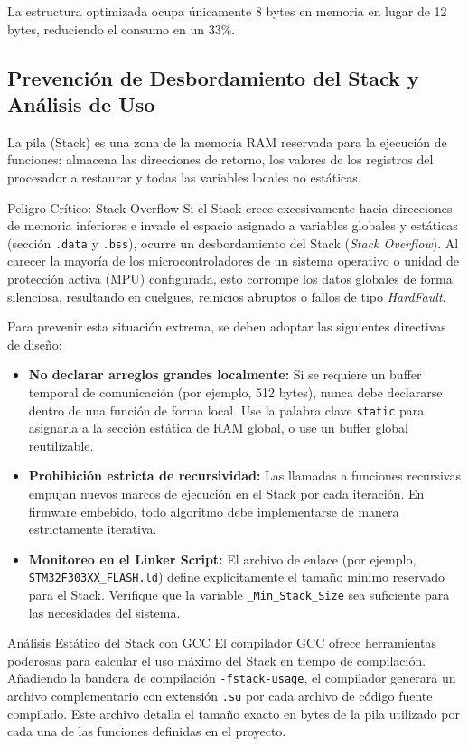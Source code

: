 \documentclass[
10pt, %
a4paper, %
oneside, %
headinclude,footinclude, %
BCOR5mm, %
]{scrartcl}
\begin{document}
La estructura optimizada ocupa únicamente 8 bytes en memoria en lugar de 12 bytes, reduciendo el consumo en un 33\%.

\subsection{Prevención de Desbordamiento del Stack y Análisis de Uso}
La pila (Stack) es una zona de la memoria RAM reservada para la ejecución de funciones: almacena las direcciones de retorno, los valores de los registros del procesador a restaurar y todas las variables locales no estáticas.

\begin{ErrorBox}{Peligro Crítico: Stack Overflow}
	Si el Stack crece excesivamente hacia direcciones de memoria inferiores e invade el espacio asignado a variables globales y estáticas (sección \texttt{.data} y \texttt{.bss}), ocurre un desbordamiento del Stack (\textit{Stack Overflow}). Al carecer la mayoría de los microcontroladores de un sistema operativo o unidad de protección activa (MPU) configurada, esto corrompe los datos globales de forma silenciosa, resultando en cuelgues, reinicios abruptos o fallos de tipo \textit{HardFault}.
\end{ErrorBox}

Para prevenir esta situación extrema, se deben adoptar las siguientes directivas de diseño:
\begin{itemize}
	\item \textbf{No declarar arreglos grandes localmente:} Si se requiere un buffer temporal de comunicación (por ejemplo, 512 bytes), nunca debe declararse dentro de una función de forma local. Use la palabra clave \texttt{static} para asignarla a la sección estática de RAM global, o use un buffer global reutilizable.
	\item \textbf{Prohibición estricta de recursividad:} Las llamadas a funciones recursivas empujan nuevos marcos de ejecución en el Stack por cada iteración. En firmware embebido, todo algoritmo debe implementarse de manera estrictamente iterativa.
	\item \textbf{Monitoreo en el Linker Script:} El archivo de enlace (por ejemplo, \texttt{STM32F303XX\_FLASH.ld}) define explícitamente el tamaño mínimo reservado para el Stack. Verifique que la variable \texttt{\_Min\_Stack\_Size} sea suficiente para las necesidades del sistema.
\end{itemize}

\begin{InfoBox}{Análisis Estático del Stack con GCC}
	El compilador GCC ofrece herramientas poderosas para calcular el uso máximo del Stack en tiempo de compilación. Añadiendo la bandera de compilación \texttt{-fstack-usage}, el compilador generará un archivo complementario con extensión \texttt{.su} por cada archivo de código fuente compilado. Este archivo detalla el tamaño exacto en bytes de la pila utilizado por cada una de las funciones definidas en el proyecto.
\end{InfoBox}
\end{document}
